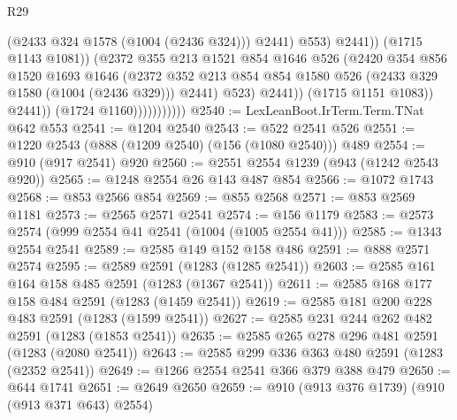 \begin{lexlean}{R29}
\begin{coremodule}
                                          (@2433 @324 @1578 (@1004 (@2436 @324)))
                                          @2441)
                                        @553)
                                      @2441))
                                  (@1715 @1143 @1081))
                                (@2372
                                  @355
                                  @213
                                  @1521
                                  @854
                                  @1646
                                  @526
                                  (@2420
                                    @354
                                    @856
                                    @1520
                                    @1693
                                    @1646
                                    (@2372
                                      @352
                                      @213
                                      @854
                                      @854
                                      @1580
                                      @526
                                      (@2433 @329 @1580 (@1004 (@2436 @329)))
                                      @2441)
                                    @523)
                                  @2441))
                              (@1715 @1151 @1083))
                            @2441))
                        (@1724 @1160)))))))))))
@2540 := LexLeanBoot.IrTerm.Term.TNat @642 @553
@2541 := @1204 @2540
@2543 := @522 @2541 @526
@2551 := @1220 @2543 (@888 (@1209 @2540) (@156 (@1080 @2540))) @489
@2554 := @910 (@917 @2541) @920
@2560 := @2551 @2554 @1239 (@943 (@1242 @2543 @920))
@2565 := @1248 @2554 @26 @143 @487 @854
@2566 := @1072 @1743
@2568 := @853 @2566 @854
@2569 := @855 @2568
@2571 := @853 @2569 @1181
@2573 := @2565 @2571 @2541
@2574 := @156 @1179
@2583 := @2573 @2574 (@999 @2554 @41 @2541 (@1004 (@1005 @2554 @41)))
@2585 := @1343 @2554 @2541
@2589 := @2585 @149 @152 @158 @486
@2591 := @888 @2571 @2574
@2595 := @2589 @2591 (@1283 (@1285 @2541))
@2603 := @2585 @161 @164 @158 @485 @2591 (@1283 (@1367 @2541))
@2611 := @2585 @168 @177 @158 @484 @2591 (@1283 (@1459 @2541))
@2619 := @2585 @181 @200 @228 @483 @2591 (@1283 (@1599 @2541))
@2627 := @2585 @231 @244 @262 @482 @2591 (@1283 (@1853 @2541))
@2635 := @2585 @265 @278 @296 @481 @2591 (@1283 (@2080 @2541))
@2643 := @2585 @299 @336 @363 @480 @2591 (@1283 (@2352 @2541))
@2649 := @1266 @2554 @2541 @366 @379 @388 @479
@2650 := @644 @1741
@2651 := @2649 @2650
@2659 := @910 (@913 @376 @1739) (@910 (@913 @371 @643) @2554)

\end{coremodule}
\end{lexlean}
